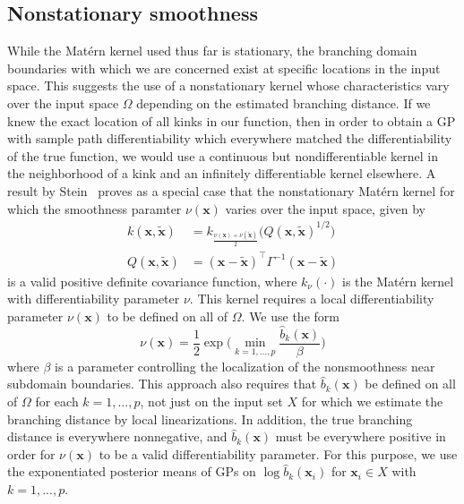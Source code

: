 \documentclass{article}
\renewcommand{\vec}[1]{\mathbf{#1}}
\begin{document}
\subsection{Nonstationary smoothness}
While the Mat\'ern kernel used thus far is stationary, the branching domain boundaries with which we are concerned exist at specific locations in the input space. This suggests the use of a nonstationary kernel whose characteristics vary over the input space $\Omega$ depending on the estimated branching distance. If we knew the exact location of all kinks in our function, then in order to obtain a GP with sample path differentiability which everywhere matched the differentiability of the true function, we would use a continuous but nondifferentiable kernel in the neighborhood of a kink and an infinitely differentiable kernel elsewhere. A result by Stein~\cite{stein2005nonstationary} proves as a special case that the nonstationary Mat\'ern kernel for which the smoothness paramter $\nu(\vec{x})$ varies over the input space, given by
\begin{align*}
  k(\vec{x}, \tilde{\vec{x}})
  & = k_{\frac{\nu(\vec{x}) + \nu(\tilde{\vec{x}})}{2}}\Big(Q(\vec{x}, \tilde{\vec{x}})^{1/2}\Big) \\
  Q(\vec{x}, \tilde{\vec{x}}) & = (\vec{x} - \tilde{\vec{x}})^\top \Gamma^{-1} (\vec{x} - \tilde{\vec{x}})
\end{align*}
is a valid positive definite covariance function, where $k_\nu(\cdot)$ is the Mat\'ern kernel with differentiability parameter $\nu$. This kernel requires a local differentiability parameter $\nu(\vec{x})$ to be defined on all of $\Omega$. We use the form
$$ \nu(\vec{x}) = \frac{1}{2} \exp\bigg(\min_{k=1,...,p} \frac{\hat{b}_k(\vec{x})}{\beta} \bigg) $$
where $\beta$ is a parameter controlling the localization of the nonsmoothness near subdomain boundaries. This approach also requires that $\hat{b}_k(\vec{x})$ be defined on all of $\Omega$ for each $k=1,...,p$, not just on the input set $X$ for which we estimate the branching distance by local linearizations. In addition, the true branching distance is everywhere nonnegative, and $\hat{b}_k(\vec{x})$ must be everywhere positive in order for $\nu(\vec{x})$ to be a valid differentiability parameter. For this purpose, we use the exponentiated posterior means of GPs on $\log \hat{b}_k(\vec{x}_i)$ for $\vec{x}_i \in X$ with $k=1,...,p$.
\end{document}
